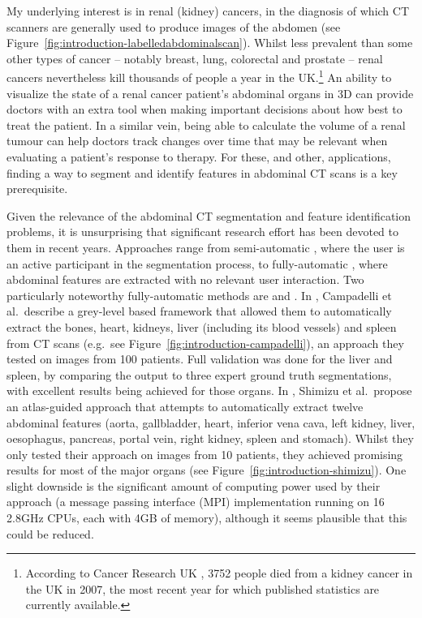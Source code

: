 My underlying interest is in renal (kidney) cancers, in the diagnosis of which CT scanners are generally used to produce images of the abdomen (see Figure~\ref{fig:introduction-labelledabdominalscan}). Whilst less prevalent than some other types of cancer -- notably breast, lung, colorectal and prostate -- renal cancers nevertheless kill thousands of people a year in the UK.\footnote{According to Cancer Research UK \cite{cruk-kidneycancermortality}, 3752 people died from a kidney cancer in the UK in 2007, the most recent year for which published statistics are currently available.} An ability to visualize the state of a renal cancer patient's abdominal organs in 3D can provide doctors with an extra tool when making important decisions about how best to treat the patient. In a similar vein, being able to calculate the volume of a renal tumour can help doctors track changes over time that may be relevant when evaluating a patient's response to therapy. For these, and other, applications, finding a way to segment and identify features in abdominal CT scans is a key prerequisite.


Given the relevance of the abdominal CT segmentation and feature identification problems, it is unsurprising that significant research effort has been devoted to them in recent years. Approaches range from semi-automatic \cite{?}, where the user is an active participant in the segmentation process, to fully-automatic \cite{?}, where abdominal features are extracted with no relevant user interaction. Two particularly noteworthy fully-automatic methods are \cite{campadelli09} and \cite{shimizu07}. In \cite{campadelli09}, Campadelli et al.\ describe a grey-level based framework that allowed them to automatically extract the bones, heart, kidneys, liver (including its blood vessels) and spleen from CT scans (e.g.~see Figure~\ref{fig:introduction-campadelli}), an approach they tested on images from 100 patients. Full validation was done for the liver and spleen, by comparing the output to three expert ground truth segmentations, with excellent results being achieved for those organs. In \cite{shimizu07}, Shimizu et al.\ propose an atlas-guided approach that attempts to automatically extract twelve abdominal features (aorta, gallbladder, heart, inferior vena cava, left kidney, liver, oesophagus, pancreas, portal vein, right kidney, spleen and stomach). Whilst they only tested their approach on images from 10 patients, they achieved promising results for most of the major organs (see Figure~\ref{fig:introduction-shimizu}). One slight downside is the significant amount of computing power used by their approach (a message passing interface (MPI) implementation running on 16 2.8GHz CPUs, each with 4GB of memory), although it seems plausible that this could be reduced.

